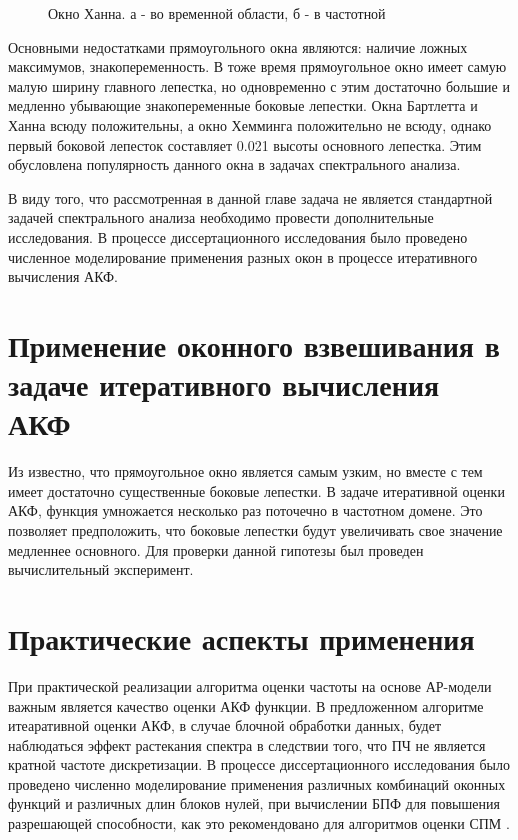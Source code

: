 \begin{figure}[h]
	\center{}
	\caption{Окно Ханна. а - во временной области, б - в частотной}
	\label{pic:win_hann}
\end{figure}

Основными недостатками прямоугольного окна являются: наличие ложных максимумов, знакопеременность. В тоже время прямоугольное окно имеет самую малую ширину главного лепестка, но
одновременно с этим достаточно большие и медленно убывающие знакопеременные боковые лепестки. Окна Бартлетта и Ханна всюду положительны, а окно Хемминга положительно не всюду, однако
первый боковой лепесток составляет 0.021 высоты основного лепестка. Этим обусловлена популярность данного окна в задачах спектрального анализа.

В виду того, что рассмотренная в данной главе задача не является стандартной задачей спектрального анализа необходимо провести дополнительные исследования. В процессе
диссертационного исследования было проведено численное моделирование применения разных окон в процессе итеративного вычисления АКФ.

\section{Применение оконного взвешивания в задаче итеративного вычисления АКФ}

Из \cite{bolshakov-book} известно, что прямоугольное окно является самым узким, но вместе с тем имеет достаточно существенные боковые лепестки. В задаче итеративной оценки
АКФ, функция умножается несколько раз поточечно в частотном домене. Это позволяет предположить, что боковые лепестки будут увеличивать свое значение медленнее основного.
Для проверки данной гипотезы был проведен вычислительный эксперимент.

\section{Практические аспекты применения}
\label{lab:sec2_windows}

При практической реализации алгоритма оценки частоты на основе АР-модели важным является качество оценки АКФ функции. В предложенном алгоритме итеаративной оценки АКФ,
в случае блочной обработки данных, будет наблюдаться эффект растекания спектра в следствии того, что ПЧ не является кратной частоте дискретизации. В процессе диссертационного
исследования было проведено численно моделирование применения различных комбинаций оконных функций и различных длин блоков нулей, при вычислении БПФ для повышения
разрешающей способности, как это рекомендовано для алгоритмов оценки СПМ \cite{bolshakov-book}.

